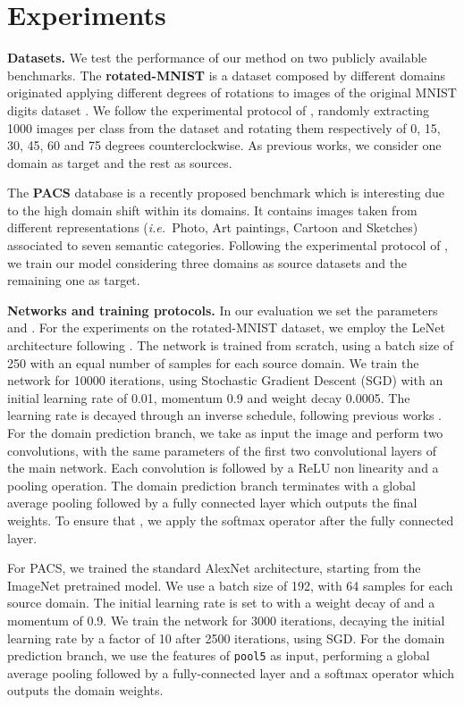 \documentclass{article}
\newcommand{\ie}{\textit{i.e.~}}
\newcommand{\myparagraph}[1]{\vspace{5pt}\noindent\textbf{#1}}
\begin{document}
\section{Experiments}
\vspace{-0.3cm}
\myparagraph{Datasets.}
We test the performance of our method on two publicly available benchmarks. The \textbf{rotated-MNIST} \cite{ghifary2015domain} is a dataset composed by different domains originated applying different degrees of rotations to images of the original MNIST digits dataset \cite{lecun1998gradient}. We follow the experimental protocol of \cite{motiian2017unified}, randomly extracting 1000 images per class from the dataset and rotating them respectively of 0, 15, 30, 45, 60 and 75 degrees counterclockwise. As previous works, we consider one domain as target and the rest as sources. 

The \textbf{PACS} database \cite{li2017deeper} is a recently proposed benchmark which is interesting due to the high domain shift within its domains. It contains images taken from different representations (\ie Photo, Art paintings, Cartoon and Sketches) associated to seven semantic categories. Following the experimental protocol of \cite{li2017deeper}, we train our model considering three domains as source datasets and the remaining one as target. \vspace{-0.2em}

\myparagraph{Networks and training protocols.}
In our evaluation we set the parameters  and . 
For the experiments on the rotated-MNIST dataset, we employ the LeNet architecture \cite{lecun1998gradient} following \cite{motiian2017unified}. The network is trained from scratch, using a batch size of 250 with an equal number of samples for each source domain.  We train the network for 10000 iterations, using Stochastic Gradient Descent (SGD) with an initial learning rate of 0.01, momentum 0.9 and weight decay 0.0005. The learning rate is decayed through an inverse schedule, following previous works \cite{ganin2015unsupervised}. For the domain prediction branch, we take as input the image and perform two convolutions, with the same parameters of the first two convolutional layers of the main network. Each convolution is followed by a ReLU non linearity and a pooling operation. The domain prediction branch terminates with a global average pooling followed by a fully connected layer which outputs the final weights. To ensure that , we apply the softmax operator after the fully connected layer. 
 
For PACS, we trained the standard AlexNet architecture, starting from the ImageNet pretrained model. We use a batch size of 192, with 64 samples for each source domain. The initial learning rate is set to  with a weight decay of  and a momentum of 0.9. We train the network for 3000 iterations, decaying the initial learning rate by a factor of 10 after 2500 iterations, using SGD. For the domain prediction branch, we use the features of \texttt{pool5} as input, performing a global average pooling followed by a fully-connected layer and a softmax operator which outputs the domain weights.
\end{document}

